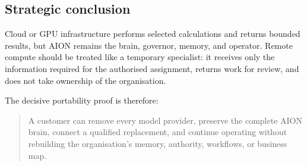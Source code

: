\subsection{Strategic conclusion}

Cloud or GPU infrastructure performs selected calculations and returns bounded
results, but AION remains the brain, governor, memory, and operator.  Remote
compute should be treated like a temporary specialist: it receives only the
information required for the authorised assignment, returns work for review,
and does not take ownership of the organisation.

The decisive portability proof is therefore:

\begin{quote}
A customer can remove every model provider, preserve the complete AION brain,
connect a qualified replacement, and continue operating without rebuilding the
organisation's memory, authority, workflows, or business map.
\end{quote}
